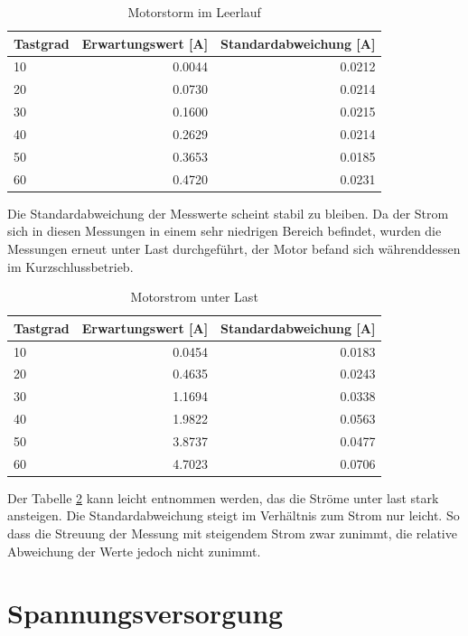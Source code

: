 \begin{table}[H]
  \centering
  \begin{tabularx}{\textwidth}{|X|r|r|}
    \hline
    Tastgrad & Erwartungswert [A] & Standardabweichung [A]  \\ \hline \hline
    10 & 0.0044 & 0.0212\\ \hline
    20 & 0.0730 & 0.0214\\ \hline
    30 & 0.1600 & 0.0215\\ \hline
    40 & 0.2629 & 0.0214\\ \hline
    50 & 0.3653 & 0.0185\\ \hline
    60 & 0.4720 & 0.0231\\ \hline

  \end{tabularx}
  \caption{Motorstorm im Leerlauf}%
  \label{tab:current_noload}
\end{table}

Die Standardabweichung der Messwerte scheint stabil zu bleiben. Da der Strom sich in diesen Messungen in einem sehr niedrigen Bereich befindet, wurden
die Messungen erneut unter Last durchgeführt, der Motor befand sich währenddessen im Kurzschlussbetrieb.

\begin{table}[H]
  \centering
  \begin{tabularx}{\textwidth}{|X|r|r|}
    \hline
    Tastgrad & Erwartungswert [A] & Standardabweichung [A]  \\ \hline \hline
    10 & 0.0454 & 0.0183\\ \hline
    20 & 0.4635 & 0.0243\\ \hline
    30 & 1.1694 & 0.0338\\ \hline
    40 & 1.9822 & 0.0563\\ \hline
    50 & 3.8737 & 0.0477\\ \hline
    60 & 4.7023 & 0.0706\\ \hline
  \end{tabularx}
  \caption{Motorstrom unter Last}%
  \label{tab:current_load}
\end{table}

Der Tabelle \ref{tab:current_load} kann leicht entnommen werden, das die Ströme unter last stark ansteigen. Die Standardabweichung steigt im Verhältnis zum Strom nur leicht.
So dass die Streuung der Messung mit steigendem Strom zwar zunimmt, die relative Abweichung der Werte jedoch nicht zunimmt.


\section{Spannungsversorgung}

